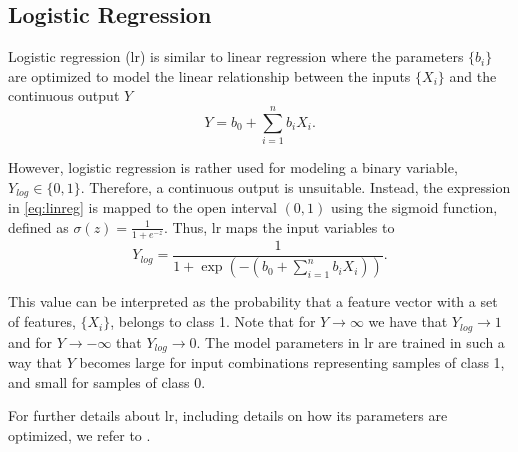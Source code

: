 \subsection{Logistic Regression}
Logistic regression (\gls{lr}) is similar to linear regression where the parameters $\{b_i\}$ are optimized to model the linear relationship between the inputs $\{X_i\}$ and the continuous output $Y$
\begin{equation}
\label{eq:linreg}
	Y= b_0+\sum_{i=1}^n b_iX_i.
\end{equation}

However, logistic regression is rather used for modeling a binary variable, $Y_{log}\in\{0,1\}$. Therefore, a continuous output is unsuitable. Instead, the expression in \eqref{eq:linreg} is mapped to the open interval $(0,1)$ using the sigmoid function, defined as $\sigma(z)=\frac{1}{1+e^{-z}}$. Thus, \gls{lr} maps the input variables to
\begin{equation}
\label{eq:log_eq}
	Y_{log}= \frac{1}{1+\exp(-(b_0 + \sum_{i=1}^n b_iX_i))}.
\end{equation}

This value can be interpreted as the probability that a feature vector with a set of features, $\{X_i\}$, belongs to class 1. Note that for $Y\rightarrow \infty$ we have that $Y_{log}\rightarrow 1$ and for $Y\rightarrow -\infty$ that $Y_{log}\rightarrow 0$. The model parameters in \gls{lr} are trained in such a way that $Y$ becomes large for input combinations representing samples of class 1, and small for samples of class 0. 

For further details about \gls{lr}, including details on how its parameters are optimized, we refer to \citep{shalev-shwartz_ben-david_2016}.





